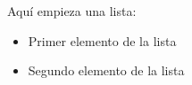 \documentclass{article}
\begin{document}
    Aqu\'i empieza una lista:
    \begin{itemize}
        \item Primer elemento de la lista
        \item Segundo elemento de la lista
    \end{itemize}
\end{document}
